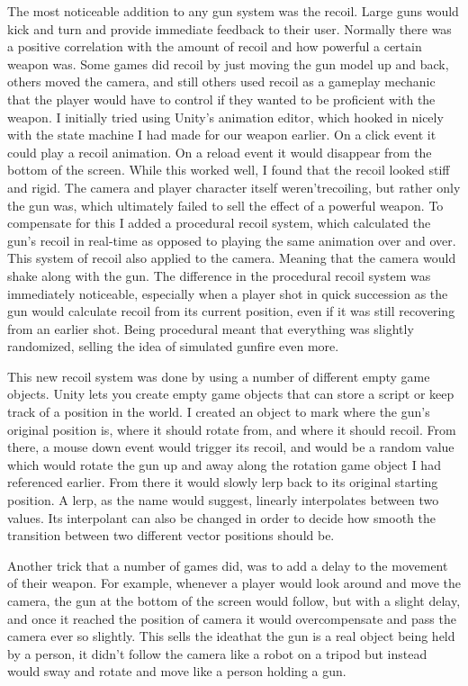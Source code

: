 \documentclass[10pt,twocolumn]{article}
\begin{document}
The most noticeable addition to any gun system was the recoil. Large guns would kick and turn and provide immediate feedback to their user. Normally there was a positive correlation with the amount of recoil and how powerful a certain weapon was. Some games did recoil by just moving the gun model up and back, others moved the camera, and still others used recoil as a gameplay mechanic that the player would have to control if they wanted to be proficient with the weapon. I initially tried using Unity’s animation editor, which hooked in nicely with the state machine I had made for our weapon earlier. On a click event it could play a recoil animation. On a reload event it would disappear from the bottom of the screen. While this worked well, I found that the recoil looked stiff and rigid. The camera and player character itself weren’trecoiling, but rather only the gun was, which ultimately failed to sell the effect of a powerful weapon. To compensate for this I added a procedural recoil system, which calculated the gun’s recoil in real-time as opposed to playing the same animation over and over. This system of recoil also applied to the camera. Meaning that the camera would shake along with the gun. The difference in the procedural recoil system was immediately noticeable, especially when a player shot in quick succession as the gun would calculate recoil from its current position, even if it was still recovering from an earlier shot. Being procedural meant that everything was slightly randomized, selling the idea of simulated gunfire even more.

This new recoil system was done by using a number of different empty game objects. Unity lets you create empty game objects that can store a script or keep track of a position in the world. I created an object to mark where the gun’s original position is, where it should rotate from, and where it should recoil. From there, a mouse down event would trigger its recoil, and would be a random value which would rotate the gun up and away along the rotation game object I had referenced earlier. From there it would slowly lerp back to its original starting position. A lerp, as the name would suggest, linearly interpolates between two values. Its interpolant can also be changed in order to decide how smooth the transition between two different vector positions should be.

Another trick that a number of games did, was to add a delay to the movement of their weapon. For example, whenever a player would look around and move the camera, the gun at the bottom of the screen would follow, but with a slight delay, and once it reached the position of camera it would overcompensate and pass the camera ever so slightly. This sells the ideathat the gun is a real object being held by a person, it didn’t follow the camera like a robot on a tripod but instead would sway and rotate and move like a person holding a gun.
\end{document}
